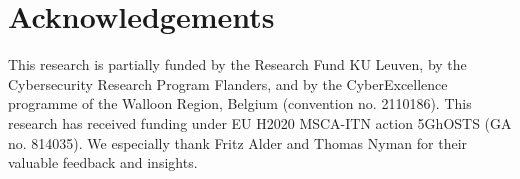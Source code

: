 \documentclass[compsoc, conference, a4paper, 10pt, times]{IEEEtran}
\begin{document}

\maketitle

\begin{abstract}
  
\end{abstract}






%

%


\ifdefined\CAMERAREADY
\section*{Acknowledgements}
This research is partially funded by the Research Fund KU Leuven, by the
Cybersecurity Research Program Flanders, and by the CyberExcellence programme of
the Walloon Region, Belgium (convention no. 2110186). This research has received funding under EU H2020
MSCA-ITN action 5GhOSTS (GA no. 814035). We especially thank Fritz
Alder and Thomas Nyman for their valuable feedback and insights.
\fi

\balance



\end{document}
